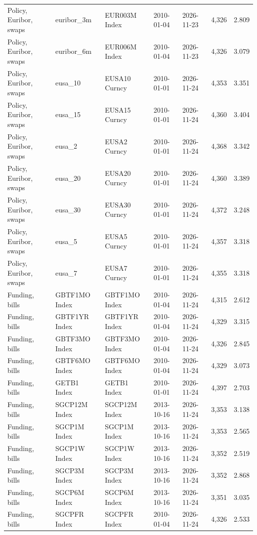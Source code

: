 \documentclass[10pt,a4paper]{article}
\begin{document}
{\begin{longtable}{lllllrr}
Policy, Euribor, swaps & euribor\_3m & EUR003M Index & 2010-01-04 & 2026-11-23 & 4,326 & 2.809 \\
Policy, Euribor, swaps & euribor\_6m & EUR006M Index & 2010-01-04 & 2026-11-23 & 4,326 & 3.079 \\
Policy, Euribor, swaps & eusa\_10 & EUSA10 Curncy & 2010-01-01 & 2026-11-24 & 4,353 & 3.351 \\
Policy, Euribor, swaps & eusa\_15 & EUSA15 Curncy & 2010-01-01 & 2026-11-24 & 4,360 & 3.404 \\
Policy, Euribor, swaps & eusa\_2 & EUSA2 Curncy & 2010-01-01 & 2026-11-24 & 4,368 & 3.342 \\
Policy, Euribor, swaps & eusa\_20 & EUSA20 Curncy & 2010-01-01 & 2026-11-24 & 4,360 & 3.389 \\
Policy, Euribor, swaps & eusa\_30 & EUSA30 Curncy & 2010-01-01 & 2026-11-24 & 4,372 & 3.248 \\
Policy, Euribor, swaps & eusa\_5 & EUSA5 Curncy & 2010-01-01 & 2026-11-24 & 4,357 & 3.318 \\
Policy, Euribor, swaps & eusa\_7 & EUSA7 Curncy & 2010-01-01 & 2026-11-24 & 4,355 & 3.318 \\
Funding, bills & GBTF1MO Index & GBTF1MO Index & 2010-01-04 & 2026-11-24 & 4,315 & 2.612 \\
Funding, bills & GBTF1YR Index & GBTF1YR Index & 2010-01-04 & 2026-11-24 & 4,329 & 3.315 \\
Funding, bills & GBTF3MO Index & GBTF3MO Index & 2010-01-04 & 2026-11-24 & 4,326 & 2.845 \\
Funding, bills & GBTF6MO Index & GBTF6MO Index & 2010-01-04 & 2026-11-24 & 4,329 & 3.073 \\
Funding, bills & GETB1 Index & GETB1 Index & 2010-01-01 & 2026-11-24 & 4,397 & 2.703 \\
Funding, bills & SGCP12M Index & SGCP12M Index & 2013-10-16 & 2026-11-24 & 3,353 & 3.138 \\
Funding, bills & SGCP1M Index & SGCP1M Index & 2013-10-16 & 2026-11-24 & 3,353 & 2.565 \\
Funding, bills & SGCP1W Index & SGCP1W Index & 2013-10-16 & 2026-11-24 & 3,352 & 2.519 \\
Funding, bills & SGCP3M Index & SGCP3M Index & 2013-10-16 & 2026-11-24 & 3,352 & 2.868 \\
Funding, bills & SGCP6M Index & SGCP6M Index & 2013-10-16 & 2026-11-24 & 3,351 & 3.035 \\
Funding, bills & SGCPFR Index & SGCPFR Index & 2010-01-04 & 2026-11-24 & 4,326 & 2.533 \\

\end{longtable}}
\end{document}
